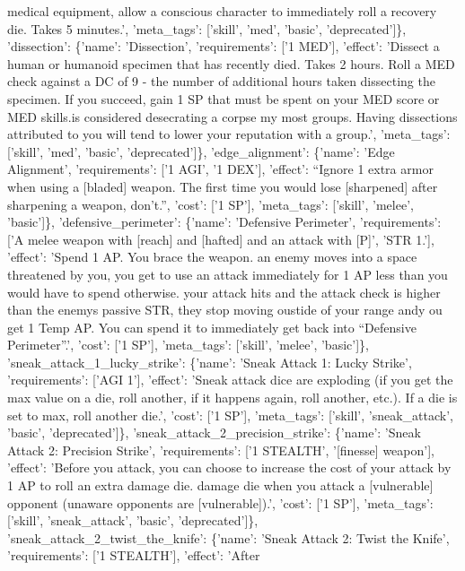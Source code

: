 \documentclass[
  letterpaper,
  DIV=11,
  numbers=noendperiod]{scrartcl}
\begin{document}
{medical equipment, allow a conscious character to immediately roll a
recovery die. Takes 5 minutes.', 'meta\_tags': {[}'skill', 'med',
'basic', 'deprecated'{]}\}, 'dissection': \{'name': 'Dissection',
'requirements': {[}'1 MED'{]}, 'effect': 'Dissect a human or humanoid
specimen that has recently died. Takes 2 hours. Roll a MED check against
a DC of 9 - the number of additional hours taken dissecting the
specimen. If you succeed, gain 1 SP that must be spent on your MED score
or MED skills.\nThis is considered desecrating a corpse my most groups.
Having dissections attributed to you will tend to lower your reputation
with a group.', 'meta\_tags': {[}'skill', 'med', 'basic',
'deprecated'{]}\}, 'edge\_alignment': \{'name': 'Edge Alignment',
'requirements': {[}'1 AGI', '1 DEX'{]}, 'effect': ``Ignore 1 extra armor
when using a {[}bladed{]} weapon. The first time you would lose
{[}sharpened{]} after sharpening a weapon, don't.'', 'cost': {[}'1
SP'{]}, 'meta\_tags': {[}'skill', 'melee', 'basic'{]}\},
'defensive\_perimeter': \{'name': 'Defensive Perimeter', 'requirements':
{[}'A melee weapon with {[}reach{]} and {[}hafted{]} and an attack with
{[}P{]}', 'STR 1.'{]}, 'effect': 'Spend 1 AP. You brace the weapon.
\nIf an enemy moves into a space threatened by you, you get to use an
attack immediately for 1 AP less than you would have to spend otherwise.
\nIf your attack hits and the attack check is higher than the
enemy\textquotesingle s passive STR, they stop moving oustide of your
range andy ou get 1 Temp AP. You can spend it to immediately get back
into ``Defensive Perimeter''.', 'cost': {[}'1 SP'{]}, 'meta\_tags':
{[}'skill', 'melee', 'basic'{]}\}, 'sneak\_attack\_1\_lucky\_strike':
\{'name': 'Sneak Attack 1: Lucky Strike', 'requirements': {[}'AGI 1'{]},
'effect': 'Sneak attack dice are exploding (if you get the max value on
a die, roll another, if it happens again, roll another, etc.). If a die
is set to max, roll another die.', 'cost': {[}'1 SP'{]}, 'meta\_tags':
{[}'skill', 'sneak\_attack', 'basic', 'deprecated'{]}\},
'sneak\_attack\_2\_precision\_strike': \{'name': 'Sneak Attack 2:
Precision Strike', 'requirements': {[}'1 STEALTH', '{[}finesse{]}
weapon'{]}, 'effect': 'Before you attack, you can choose to increase the
cost of your attack by 1 AP to roll an extra damage die.\n{} damage
die when you attack a {[}vulnerable{]} opponent (unaware opponents are
{[}vulnerable{]}).', 'cost': {[}'1 SP'{]}, 'meta\_tags': {[}'skill',
'sneak\_attack', 'basic', 'deprecated'{]}\},
'sneak\_attack\_2\_twist\_the\_knife': \{'name': 'Sneak Attack 2: Twist
the Knife', 'requirements': {[}'1 STEALTH'{]}, 'effect': 'After
}
\end{document}
